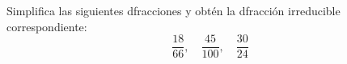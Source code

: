 \documentclass[addpoints,spanish, 12pt,a4paper]{exam}
\renewcommand*\half{.5}
\begin{document}
\begin{questions}









\question[3] Simplifica las siguientes dfracciones y obtén la dfracción irreducible correspondiente:  
\[
\dfrac{18}{66}, \quad \dfrac{45}{100}, \quad  \dfrac{30}{24}
\]
\vspace{40pt}


\end{questions}
\end{document}
